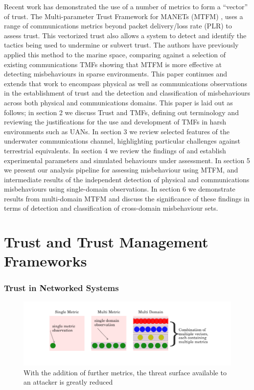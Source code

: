 Recent work has demonstrated the use of a number of metrics to form a ``vector'' of trust. The Multi-parameter Trust Framework for MANETs (MTFM) \cite{Guo11}, uses a range of communications metrics beyond packet delivery/loss rate (PLR) to assess trust. This vectorized trust also allows a system to detect and identify the tactics being used to undermine or subvert trust. The authors have previously applied this method to the marine space, comparing against a selection of existing communications TMFs \cite{Bolster2015b} showing that MTFM is more effective at detecting misbehaviours in sparse environments. This paper continues and extends that work to encompass physical as well as communications observations in the establishment of trust and the detection and classification of misbehaviours across both physical and communications domains. 
This paper is laid out as follows; in section 2 we discuss Trust and TMFs, defining out terminology and reviewing the justifications for the use and development of TMFs in harsh environments such as UANs.
In section 3 we review selected features of the underwater communications channel, highlighting particular challenges against terrestrial equivalents. 
In section 4 we review the findings of \cite{Bolster2015b} and establish experimental parameters and simulated behaviours under assessment. 
In section 5 we present our analysis pipeline for assessing misbehaviour using MTFM, and intermediate results of the independent detection of physical and communications misbehaviours using single-domain observations. 
In section 6 we demonstrate results from multi-domain MTFM and discuss the significance of these findings in terms of detection and classification of cross-domain misbehaviour sets.

\section{Trust and Trust Management Frameworks}

\subsubsection{Trust in Networked Systems}

\begin{figure}[h!]
	\centering
	\includegraphics[width=0.9\linewidth]{threat_surface_sum}
	
	\caption{With the addition of further metrics, the threat surface available to an attacker is greatly reduced}
\end{figure}

